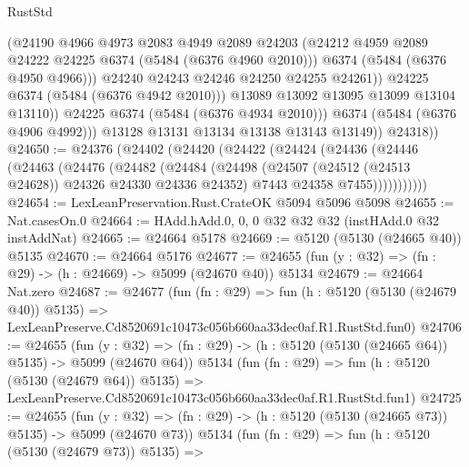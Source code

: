 \begin{lexlean}{RustStd}
\begin{coremodule}
                          (@24190
                            @4966
                            @4973
                            @2083
                            @4949
                            @2089
                            @24203
                            (@24212 @4959 @2089 @24222 @24225 @6374 (@5484 (@6376 @4960 @2010)))
                            @6374
                            (@5484 (@6376 @4950 @4966)))
                          @24240
                          @24243
                          @24246
                          @24250
                          @24255
                          @24261))
                      @24225
                      @6374
                      (@5484 (@6376 @4942 @2010)))
                    @13089
                    @13092
                    @13095
                    @13099
                    @13104
                    @13110))
                @24225
                @6374
                (@5484 (@6376 @4934 @2010)))
              @6374
              (@5484 (@6376 @4906 @4992)))
            @13128
            @13131
            @13134
            @13138
            @13143
            @13149))
        @24318))
@24650 := @24376
    (@24402
      (@24420
        (@24422
          (@24424
            (@24436
              (@24446
                (@24463
                  (@24476
                    (@24482
                      (@24484
                        (@24498
                          (@24507 (@24512 (@24513 @24628)) @24326 @24330 @24336 @24352)
                          @7443
                          @24358
                          @7455)))))))))))
@24654 := LexLeanPreservation.Rust.CrateOK @5094 @5096 @5098
@24655 := Nat.casesOn.{0}
@24664 := HAdd.hAdd.{0, 0, 0} @32 @32 @32 (instHAdd.{0} @32 instAddNat)
@24665 := @24664 @5178
@24669 := @5120 (@5130 (@24665 @40)) @5135
@24670 := @24664 @5176
@24677 := @24655 (fun (y : @32) => (fn : @29) -> (h : @24669) -> @5099 (@24670 @40)) @5134
@24679 := @24664 Nat.zero
@24687 := @24677
    (fun (fn : @29) =>
    fun (h : @5120 (@5130 (@24679 @40)) @5135) =>
    LexLeanPreserve.Cd8520691c10473c056b660aa33dec0af.R1.RustStd.fun0)
@24706 := @24655
    (fun (y : @32) => (fn : @29) -> (h : @5120 (@5130 (@24665 @64)) @5135) -> @5099 (@24670 @64))
    @5134
    (fun (fn : @29) =>
    fun (h : @5120 (@5130 (@24679 @64)) @5135) =>
    LexLeanPreserve.Cd8520691c10473c056b660aa33dec0af.R1.RustStd.fun1)
@24725 := @24655
    (fun (y : @32) => (fn : @29) -> (h : @5120 (@5130 (@24665 @73)) @5135) -> @5099 (@24670 @73))
    @5134
    (fun (fn : @29) =>
    fun (h : @5120 (@5130 (@24679 @73)) @5135) =>

\end{coremodule}
\end{lexlean}
